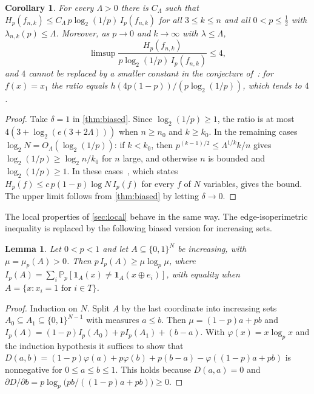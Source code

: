 \documentclass[11pt]{amsart}
\newtheorem{lemma}[theorem]{Lemma}
\newtheorem{corollary}[theorem]{Corollary}
\theoremstyle{remark}
\renewcommand{\Pr}{\mathbb{P}}
\newcommand{\bits}{\{0,1\}}
\begin{document}
\begin{corollary}\label{cor:kms}
For every $\Lambda>0$ there is $C_\Lambda$ such that $H_p(f_{n,k})\le C_\Lambda\,p\log_2(1/p)\,I_p(f_{n,k})$ for all
$3\le k\le n$ and all $0<p\le\frac12$ with $\lambda_{n,k}(p)\le\Lambda$. Moreover, as $p\to0$ and $k\to\infty$ with
$\lambda\le\Lambda$,
\[
\limsup\frac{H_p(f_{n,k})}{p\log_2(1/p)\,I_p(f_{n,k})}\le4,
\]
and $4$ cannot be replaced by a smaller constant in the conjecture of~\cite{KMS12}: for $f(x)=x_1$ the ratio equals
$h(4p(1-p))/(p\log_2(1/p))$, which tends to $4$.
\end{corollary}

\begin{proof}
Take $\delta=1$ in \cref{thm:biased}. Since $\log_2(1/p)\ge1$, the ratio is at most $4(3+\log_2(e(3+2\Lambda)))$ when
$n\ge n_0$ and $k\ge k_0$. In the remaining cases $\log_2N=O_\Lambda(\log_2(1/p))$: if $k<k_0$, then
$p^{(k-1)/2}\le\Lambda^{1/k}k/n$ gives $\log_2(1/p)\ge\log_2n/k_0$ for $n$ large, and otherwise $n$ is bounded and
$\log_2(1/p)\ge1$. In these cases~\cite[Claim~2.5]{KMS12}, which states $H_p(f)\le c\,p(1-p)\log N\,I_p(f)$ for every $f$
of $N$ variables, gives the bound. The upper limit follows from \cref{thm:biased} by letting $\delta\to0$.
\end{proof}

The local properties of \cref{sec:local} behave in the same way. The edge-isoperimetric inequality is replaced by
the following biased version for increasing sets.

\begin{lemma}\label{lem:isop}
Let $0<p<1$ and let $A\subseteq\bits^N$ be increasing, with $\mu=\mu_p(A)>0$. Then $p\,I_p(A)\ge\mu\log_p\mu$, where
$I_p(A)=\sum_i\Pr_p[\mathbf 1_A(x)\ne\mathbf 1_A(x\oplus e_i)]$, with equality when $A=\{x:x_i=1\text{ for }i\in T\}$.
\end{lemma}

\begin{proof}
Induction on $N$. Split $A$ by the last coordinate into increasing sets $A_0\subseteq A_1\subseteq\bits^{N-1}$ with
measures $a\le b$. Then $\mu=(1-p)a+pb$ and $I_p(A)=(1-p)I_p(A_0)+pI_p(A_1)+(b-a)$. With $\varphi(x)=x\log_px$ and the
induction hypothesis it suffices to show that
$D(a,b)=(1-p)\varphi(a)+p\varphi(b)+p(b-a)-\varphi((1-p)a+pb)$ is nonnegative for $0\le a\le b\le1$. This holds because
$D(a,a)=0$ and $\partial D/\partial b=p\log_p\bigl(pb/((1-p)a+pb)\bigr)\ge0$.
\end{proof}
\end{document}
